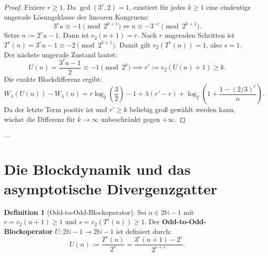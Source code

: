 \documentclass[11pt,reqno]{amsart}
\theoremstyle{definition}
\newtheorem{definition}[theorem]{Definition}
\theoremstyle{remark}
\numberwithin{equation}{section}
\begin{document}
\begin{proof}
Fixiere $r \ge 1$. Da $\gcd(3^r, 2) = 1$, existiert für jedes $k \ge 1$ eine eindeutige ungerade Lösungsklasse der linearen Kongruenz:
\begin{equation}
3^r u \equiv -1 \pmod{2^{k+1}} \iff u \equiv -3^{-r} \pmod{2^{k+1}}.
\end{equation}
Setze $n := 2^r u - 1$. Dann ist $v_2(n+1) = r$. Nach $r$ ungeraden Schritten ist $T^r(n) = 3^r u - 1 \equiv -2 \pmod{2^{k+1}}$.
Damit gilt $v_2(T^r(n)) = 1$, also $s = 1$. 
Der nächste ungerade Zustand lautet:
\begin{equation}
U(n) = \frac{3^r u - 1}{2} \equiv -1 \pmod{2^k} \implies r' := v_2(U(n) + 1) \ge k.
\end{equation}
Die exakte Blockdifferenz ergibt:
\begin{equation}
W_\lambda(U(n)) - W_\lambda(n) = r \log_2\left(\frac{3}{2}\right) - 1 + \lambda(r' - r) + \log_2\left(1 + \frac{1 - (2/3)^r}{n}\right).
\end{equation}
Da der letzte Term positiv ist und $r' \ge k$ beliebig groß gewählt werden kann, wächst die Differenz für $k \to \infty$ unbeschränkt gegen $+\infty$.
\end{proof}

---

\section{Die Blockdynamik und das asymptotische Divergenzgatter}

\begin{definition}[Odd-to-Odd-Blockoperator]
Sei $n \in 2\mathbb{N}-1$ mit $r = v_2(n+1) \ge 1$ und $s = v_2(T^r(n)) \ge 1$. Der \textbf{Odd-to-Odd-Blockoperator} $U: 2\mathbb{N}-1 \to 2\mathbb{N}-1$ ist definiert durch:
\begin{equation}
U(n) := \frac{T^r(n)}{2^s} = \frac{3^r(n+1) - 2^r}{2^{r+s}}.
\end{equation}
\end{definition}
\end{document}
